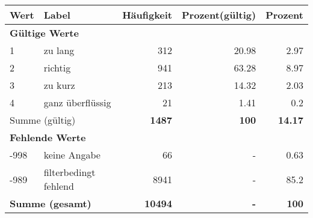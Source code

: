      \begin{longtable}{lXrrr}
     \toprule
     \textbf{Wert} & \textbf{Label} & \textbf{Häufigkeit} & \textbf{Prozent(gültig)} & \textbf{Prozent} \\
     \endhead
     \midrule
     \multicolumn{5}{l}{\textbf{Gültige Werte}}\\

     1 &
     \multicolumn{1}{X}{ zu lang   } &


       \num{312} &
       \num[round-mode=places,round-precision=2]{20.98} &
         \num[round-mode=places,round-precision=2]{2.97} \\

     2 &
     \multicolumn{1}{X}{ richtig   } &


       \num{941} &
       \num[round-mode=places,round-precision=2]{63.28} &
         \num[round-mode=places,round-precision=2]{8.97} \\

     3 &
     \multicolumn{1}{X}{ zu kurz   } &


       \num{213} &
       \num[round-mode=places,round-precision=2]{14.32} &
         \num[round-mode=places,round-precision=2]{2.03} \\

     4 &
     \multicolumn{1}{X}{ ganz überflüssig   } &


       \num{21} &
       \num[round-mode=places,round-precision=2]{1.41} &
         \num[round-mode=places,round-precision=2]{0.2} \\
     \midrule
     \multicolumn{2}{l}{Summe (gültig)} &
       \textbf{\num{1487}} &
     \textbf{\num{100}} &
       \textbf{\num[round-mode=places,round-precision=2]{14.17}} \\
     \multicolumn{5}{l}{\textbf{Fehlende Werte}}\\
       -998 &
       keine Angabe &
         \num{66} &
        - &
         \num[round-mode=places,round-precision=2]{0.63} \\
       -989 &
       filterbedingt fehlend &
         \num{8941} &
        - &
         \num[round-mode=places,round-precision=2]{85.2} \\
     \midrule
     \multicolumn{2}{l}{\textbf{Summe (gesamt)}} &
          \textbf{\num{10494}} &
        \textbf{-} &
        \textbf{\num{100}} \\
     \bottomrule
     \end{longtable}
     
